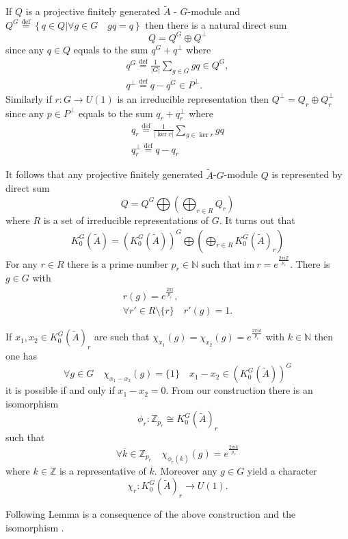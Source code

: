 \documentclass{beamer}
\theoremstyle{plain}
\newcommand{\be}{\begin{equation}}
\newcommand{\ee}{\end{equation}}
\newcommand{\Z}{\mathbb{Z}}                  %
\newcommand{\im}{\mathrm{im}}       %
\newcommand{\N}{\mathbb{N}}                  %
\newcommand{\bean}{\begin{eqnarray*}}
\newcommand{\eean}{\end{eqnarray*}}
\newcommand{\bydef}{\stackrel{\mathrm{def}}{=}}
\begin{document}
\begin{frame}
If $Q$ is a projective finitely generated  $\widetilde A$ - $G$-module  and $Q^G \bydef \left\{q \in Q \left| \forall g \in G\quad gq=q \right.\right\}$ then there is a natural direct sum
$$
Q = Q^G \oplus Q^\perp
$$
since any $q\in Q$ equals to the sum $q^G + q^\perp$ where
\bean
q^G \bydef \frac{1}{\left| G\right| }\sum _{g\in G}g q \in Q^G,\\
q^\perp \bydef q - q^G \in P^\perp.
\eean
Similarly if $r: G \to U\left( 1\right)$ is an irreducible representation then $Q^\perp = Q_r \oplus Q_r^\perp$ since any $p\in P^\perp$ equals to the sum $q_r + q_r^\perp$ where
\bean
q_r\bydef \frac{1}{\left| \ker r\right| }\sum _{g\in \ker r}g q\\
q_r^\perp \bydef q - q_r
\eean

\end{frame}
\begin{frame}
It follows that any projective finitely generated  $\widetilde A$-$G$-module $Q$ is represented by direct sum 
$$
Q = Q^G \bigoplus \left(\bigoplus_{r \in R} Q_r\right) 
$$
where $R$ is a set of irreducible representations of $G$. It turns out that
\bean
K^{G}_0 \left(\widetilde A \right)= \left(K^{G}_0 \left(\widetilde A \right) \right) ^G \bigoplus \left(\bigoplus_{r \in R} K^{G}_0 \left(\widetilde A \right)_r\right)
\eean
For any $r\in R$ there is a prime number $p_r \in \N$ such that $\im ~r = e^{\frac{2\pi i \Z}{p_r}}$. There is $g\in G$ with
\bean
r\left( g\right) =  e^{\frac{2\pi i}{p_r}},\\
\forall r' \in R\setminus \{r\}\quad r'(g)= 1.
\eean

\end{frame}
\begin{frame}
	If $x_1, x_2 \in K^{G}_0 \left(\widetilde A \right)_r$ are such that $\chi_{x_1} \left(g \right) = \chi_{x_2} \left(g \right)= e^{\frac{2\pi i k}{p_r}}$  with $k\in \N$  then one has
	$$
	\forall g \in G \quad\chi_{x_1-x_2} \left(g \right)=\{1\}\quad x_1-x_2 \in  \left(K^{G}_0 \left(\widetilde A \right) \right) ^G
	$$ 
	it is possible if and only if $x_1 - x_2 = 0$. From our construction there is an isomorphism
	$$
	\phi_r : \Z_{p_r} \cong K^{G}_0 \left(\widetilde A \right)_r
	$$
	such that
	$$
	\forall \overline k \in \Z_{p_r} \quad \chi_{\phi_r\left( \overline k\right) }\left( g\right) = e^{\frac{2\pi i k}{p_r}}
	$$
	where $k \in \Z$ is a representative of $\overline{k}$. Moreover any $g \in G$  yield a character
	\be\label{chi_r_eqn}
	\chi_r : K^{G}_0 \left(\widetilde A \right)_r \to U(1).
	\ee
	
Following Lemma is a consequence of the above construction and the isomorphism .

\end{frame}
\end{document}
